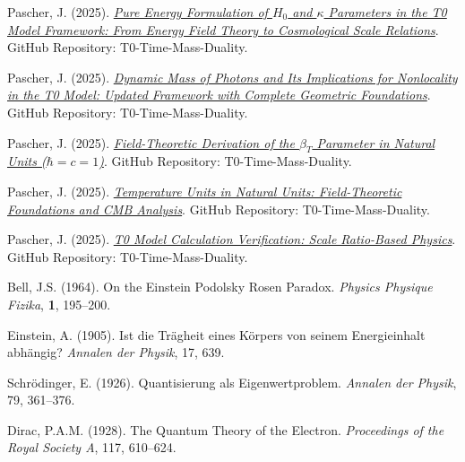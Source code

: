 \documentclass[12pt,a4paper]{article}
\begin{document}
	\begin{thebibliography}{99}
		Pascher, J. (2025). \href{https://github.com/jpascher/T0-Time-Mass-Duality/blob/main/2/pdf/Ho_EnergieEn.pdf}{\textit{Pure Energy Formulation of $H_0$ and $\kappa$ Parameters in the T0 Model Framework: From Energy Field Theory to Cosmological Scale Relations}}. GitHub Repository: T0-Time-Mass-Duality.
		
		Pascher, J. (2025). \href{https://github.com/jpascher/T0-Time-Mass-Duality/blob/main/2/pdf/DynMassePhotonenNichtlokalEn.pdf}{\textit{Dynamic Mass of Photons and Its Implications for Nonlocality in the T0 Model: Updated Framework with Complete Geometric Foundations}}. GitHub Repository: T0-Time-Mass-Duality.
		
		Pascher, J. (2025). \href{https://github.com/jpascher/T0-Time-Mass-Duality/blob/main/2/pdf/DerivationVonBetaEn.pdf}{\textit{Field-Theoretic Derivation of the $\beta_T$ Parameter in Natural Units ($\hbar = c = 1$)}}. GitHub Repository: T0-Time-Mass-Duality.
		
		Pascher, J. (2025). \href{https://github.com/jpascher/T0-Time-Mass-Duality/blob/main/2/pdf/TempEinheitenCMBEn.pdf}{\textit{Temperature Units in Natural Units: Field-Theoretic Foundations and CMB Analysis}}. GitHub Repository: T0-Time-Mass-Duality.
		
		Pascher, J. (2025). \href{https://github.com/jpascher/T0-Time-Mass-Duality/blob/main/2/pdf/Elimination_Of_Mass_Dirac_Tabelle.pdf}{\textit{T0 Model Calculation Verification: Scale Ratio-Based Physics}}. GitHub Repository: T0-Time-Mass-Duality.
		
		Bell, J.S. (1964). On the Einstein Podolsky Rosen Paradox. \textit{Physics Physique Fizika}, \textbf{1}, 195--200.
		
		Einstein, A. (1905). Ist die Trägheit eines Körpers von seinem Energieinhalt abhängig? \textit{Annalen der Physik}, 17, 639.
		
		Schrödinger, E. (1926). Quantisierung als Eigenwertproblem. \textit{Annalen der Physik}, 79, 361--376.
		
		Dirac, P.A.M. (1928). The Quantum Theory of the Electron. \textit{Proceedings of the Royal Society A}, 117, 610--624.
	\end{thebibliography}
	
\end{document}
